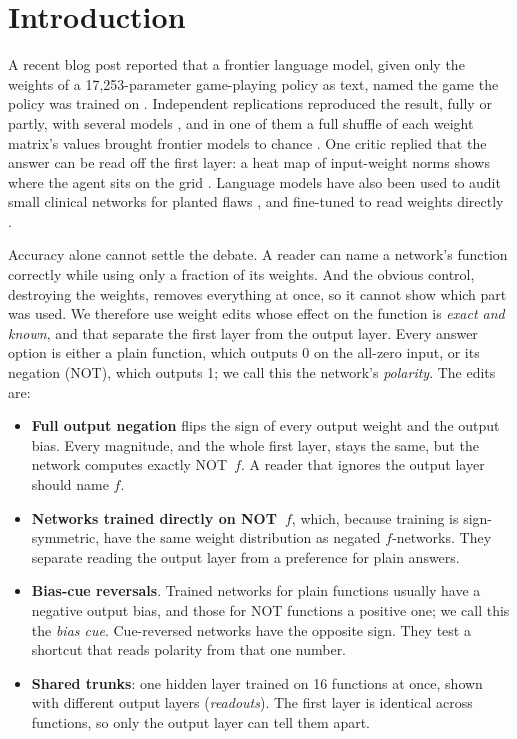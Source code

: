 \documentclass[10pt]{article}
\begin{document}
\section{Introduction}
A recent blog post reported that a frontier language model, given only the weights of a 17,253-parameter game-playing policy as text, named the game the policy was trained on \citep{takehi2026sparks}. Independent replications reproduced the result, fully or partly, with several models \citep{turing2026weights,openwsp2026,willison2026qwen}, and in one of them a full shuffle of each weight matrix's values brought frontier models to chance \citep{turing2026weights}. One critic replied that the answer can be read off the first layer: a heat map of input-weight norms shows where the agent sits on the grid \citep{goedecke2026}. Language models have also been used to audit small clinical networks for planted flaws \citep{nusrat2026auditing}, and fine-tuned to read weights directly \citep{weightoracles2026}.

Accuracy alone cannot settle the debate. A reader can name a network's function correctly while using only a fraction of its weights. And the obvious control, destroying the weights, removes everything at once, so it cannot show which part was used. We therefore use weight edits whose effect on the function is \emph{exact and known}, and that separate the first layer from the output layer. Every answer option is either a plain function, which outputs 0 on the all-zero input, or its negation (NOT), which outputs 1; we call this the network's \emph{polarity}. The edits are:
\begin{itemize}
\item \textbf{Full output negation} flips the sign of every output weight and the output bias. Every magnitude, and the whole first layer, stays the same, but the network computes exactly NOT~$f$. A reader that ignores the output layer should name $f$.
\item \textbf{Networks trained directly on NOT~$f$}, which, because training is sign-symmetric, have the same weight distribution as negated $f$-networks. They separate reading the output layer from a preference for plain answers.
\item \textbf{Bias-cue reversals}. Trained networks for plain functions usually have a negative output bias, and those for NOT functions a positive one; we call this the \emph{bias cue}. Cue-reversed networks have the opposite sign. They test a shortcut that reads polarity from that one number.
\item \textbf{Shared trunks}: one hidden layer trained on 16 functions at once, shown with different output layers (\emph{readouts}). The first layer is identical across functions, so only the output layer can tell them apart.
\end{itemize}
\end{document}

